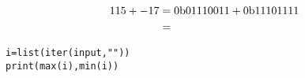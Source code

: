 \documentclass{article}
\begin{document}
\pagecolor{black}
\color{white}


\newpage{}

\newpage{}

\newpage{}

\newpage{}

\newpage{}

\newpage{}

\newpage{}

\newpage{}

    \begin{align*}
        115 + -17 &= 0\text b01110011 + 0\text b11101111 \\
                  &= 
    \end{align*}

\newpage{}
\begin{verbatim}i=list(iter(input,""))
print(max(i),min(i))
\end{verbatim}
\end{document}

